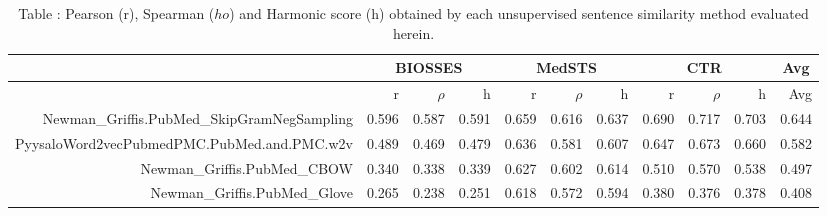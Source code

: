 

\begin{table}[!h]
\centering
\caption{Table \label{table:BioSentenceSimFinalRawOutputFiles}: Pearson (r), Spearman ($
ho$) and Harmonic score (h) obtained by each unsupervised sentence similarity method evaluated herein.} 
\begingroup\tiny
\begin{tabular}{rrrrrrrrrrr}
  \hline \multicolumn{1}{c}{ } & \multicolumn{3}{c}{BIOSSES} & \multicolumn{3}{c}{MedSTS} & \multicolumn{3}{c}{CTR} & \multicolumn{1}{c}{Avg} \\  \hline
 & r & $\rho$ & h & r & $\rho$ & h & r & $\rho$ & h & Avg \\ 
  \hline
Newman\_Griffis.PubMed\_SkipGramNegSampling & 0.596 & 0.587 & 0.591 & 0.659 & 0.616 & 0.637 & 0.690 & 0.717 & 0.703 & 0.644 \\ 
  PyysaloWord2vecPubmedPMC.PubMed.and.PMC.w2v & 0.489 & 0.469 & 0.479 & 0.636 & 0.581 & 0.607 & 0.647 & 0.673 & 0.660 & 0.582 \\ 
  Newman\_Griffis.PubMed\_CBOW & 0.340 & 0.338 & 0.339 & 0.627 & 0.602 & 0.614 & 0.510 & 0.570 & 0.538 & 0.497 \\ 
  Newman\_Griffis.PubMed\_Glove & 0.265 & 0.238 & 0.251 & 0.618 & 0.572 & 0.594 & 0.380 & 0.376 & 0.378 & 0.408 \\ 
   \hline
\end{tabular}
\endgroup
\end{table}
